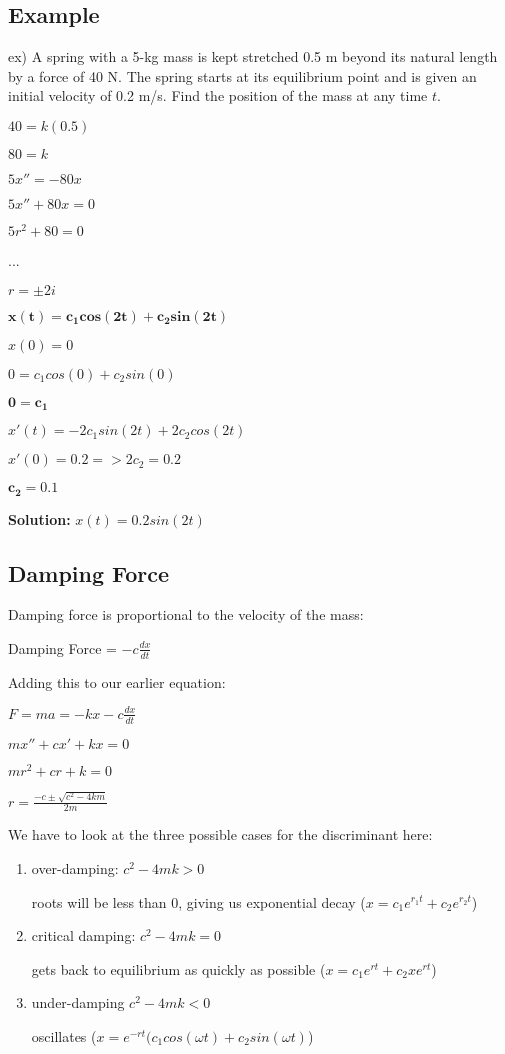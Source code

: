 \documentclass{article}
\begin{document}
\subsection{Example}

ex) A spring with a 5-kg mass is kept stretched 0.5 m beyond its natural length by a force of 40 N. The spring starts at its equilibrium point and is given an initial velocity of 0.2 m/s. Find the position of the mass at any time $t$.

$40 = k(0.5)$

$80 = k$

$5x'' = -80x$

$5x'' + 80x = 0$

$5r^2+80 = 0$

...

$r = \pm 2i$

$\mathbf{x(t) = c_1 cos(2t) + c_2 sin(2t)}$

$x(0) = 0$

$0 = c_1 cos(0) + c_2 sin(0)$

$\mathbf{0 = c_1}$

$x'(t)=-2c_1 sin(2t) + 2c_2 cos(2t)$

$x'(0) = 0.2 => 2c_2 = 0.2$

$\mathbf{c_2 = 0.1}$

\textbf{Solution:} $x(t) = 0.2 sin(2t)$

\subsection{Damping Force}

Damping force is proportional to the velocity of the mass:

Damping Force = $-c \frac{dx}{dt}$
 
Adding this to our earlier equation: 

$F = ma = -kx - c \frac{dx}{dt}$

$mx'' + cx'+kx=0$

$mr^2+cr+k=0$

$r = \frac{-c \pm \sqrt{c^2-4km}}{2m}$

We have to look at the three possible cases for the discriminant here:

\begin{enumerate}
    \item over-damping: $c^2-4mk>0$
    
    roots will be less than 0, giving us exponential decay ($x=c_1 e^{r_1 t}+c_2 e^{r_2 t}$)
    \item critical damping: $c^2-4mk = 0$
    
    gets back to equilibrium as quickly as possible ($x = c_1e^{rt} + c_2 x e^{rt}$)
    \item under-damping $c^2-4mk<0$
    
    oscillates ($x=e^{-rt}(c_1 cos(\omega t)+c_2 sin(\omega t)$)
\end{enumerate}
\end{document}
